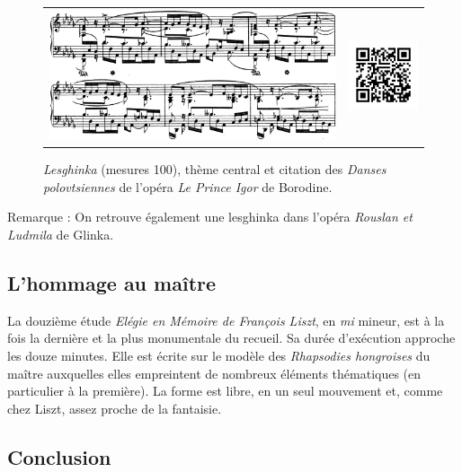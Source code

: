 \begin{figure}[!ht]
  \begin{bigcenter}
    \vspace*{-0.5cm}
    \begin{tabular}{lr}
      \includegraphics[width=12.5cm, keepaspectratio]{lesghinka-theme3.png}
      &
      \includegraphics[width=3cm, keepaspectratio]{op11-qr.png}
    \end{tabular}
  \end{bigcenter}
  \caption{\label{lesghinka-3}\emph{Lesghinka} (mesures 100), thème central et citation des \emph{Danses polovtsiennes} de l’opéra \emph{Le Prince Igor} de Borodine.}
\end{figure}

Remarque : On retrouve également une lesghinka dans l'opéra \emph{Rouslan et Ludmila} de Glinka.

\subsection{L'hommage au maître}

La douzième étude \emph{Elégie en Mémoire de François Liszt}, en \emph{mi} mineur, est à la fois la dernière et la plus monumentale du recueil. Sa durée d'exécution approche les douze minutes. Elle est écrite sur le modèle des \emph{Rhapsodies hongroises} du maître auxquelles elles empreintent de nombreux éléments thématiques (en particulier à la première). La forme est libre, en un seul mouvement et, comme chez Liszt, assez proche de la fantaisie.

\subsection{Conclusion}

